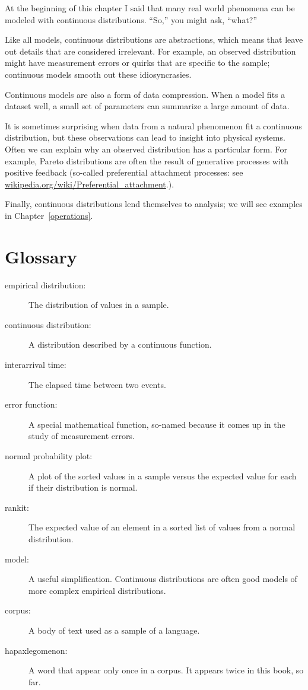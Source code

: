 \documentclass[12pt]{book}
\begin{document}
At the beginning of this chapter I said that many real world phenomena
can be modeled with continuous distributions.  ``So,'' you might ask,
``what?''

Like all models, continuous distributions are abstractions, which
means that leave out details that are considered irrelevant.
For example, an observed distribution might have measurement errors
or quirks that are specific to the sample; continuous models smooth
out these idiosyncrasies.

Continuous models are also a form of data compression.  When a model
fits a dataset well, a small set of parameters can summarize a
large amount of data.

It is sometimes surprising when data from a natural phenomenon fit a
continuous distribution, but these observations can lead to insight
into physical systems.  Often we can explain why an observed
distribution has a particular form.  For example, Pareto distributions
are often the result of generative processes with positive feedback
(so-called preferential attachment processes: see
\url{wikipedia.org/wiki/Preferential_attachment}.).

Finally, continuous distributions lend themselves to analysis; we
will see examples in Chapter~\ref{operations}.


\section{Glossary}

\begin{description}

\item[empirical distribution:] The distribution of values in a sample.

\item[continuous distribution:] A distribution described by a continuous
function.

\item[interarrival time:] The elapsed time between two events.

\item[error function:] A special mathematical function, so-named
  because it comes up in the study of measurement errors.

\item[normal probability plot:] A plot of the sorted values in a sample
versus the expected value for each if their distribution is normal.

\item[rankit:] The expected value of an element in a sorted list of
values from a normal distribution.

\item[model:] A useful simplification.  Continuous distributions are
often good models of more complex empirical distributions.

\item[corpus:] A body of text used as a sample of a language.

\item[hapaxlegomenon:] A word that appear only once in a corpus.
It appears twice in this book, so far.

\end{description}
\end{document}
